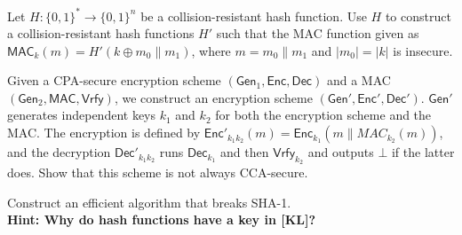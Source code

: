 \documentclass[a4paper,10pt,landscape,twocolumn]{scrartcl}
\begin{document}
\begin{exercise}[HMAC?]
  Let $H: \{0,1\}^*\to \{0,1\}^n$ be a collision-resistant hash function. Use $H$ to construct a collision-resistant hash functions $H'$ such that the MAC function given as $\mathsf{MAC}_k(m)=H'(k\oplus m_0\|m_1)$, where $m=m_0\|m_1$ and $|m_0|=|k|$ is insecure.
\end{exercise}

\begin{exercise}

Given a CPA-secure encryption scheme $(\mathsf{Gen}_1, \mathsf{Enc}, \mathsf{Dec})$ and a MAC $(\mathsf{Gen}_2, \mathsf{MAC}, \mathsf{Vrfy})$, we construct an encryption scheme $(\mathsf{Gen}', \mathsf{Enc}', \mathsf{Dec}')$. $\mathsf{Gen}'$ generates independent keys $k_1$ and $k_2$ for both the encryption scheme and the MAC. The encryption is defined by $\mathsf{Enc}'_{k_1k_2}(m)=\mathsf{Enc}_{k_1}(m\|MAC_{k_2}(m))$, and the decryption $\mathsf{Dec}'_{k_1k_2}$ runs $\mathsf{Dec}_{k_1}$ and then $\mathsf{Vrfy}_{k_2}$ and outputs $\bot$ if the latter does. Show that this scheme is not always CCA-secure.


\end{exercise}






\begin{bonusexercise}[SHA-1]
	Construct an efficient algorithm that breaks SHA-1.\\
	\textbf{Hint: Why do hash functions have a key in [KL]?}
\end{bonusexercise}
\end{document}
